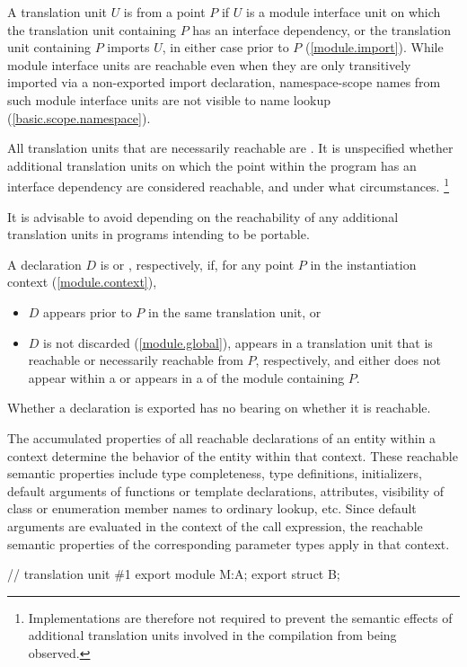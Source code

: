 \begin{std.txt}\color{addclr}
\pnum
A translation unit $U$ is  from a point $P$ if
$U$ is a module interface unit on which the translation unit containing $P$
has an interface dependency, or
the translation unit containing $P$ imports $U$,
in either case prior to $P$ (\ref{module.import}).
\enternote
While module interface units are reachable even when they are only
transitively imported via a non-exported import declaration,
namespace-scope names from such module interface units are not visible
to name lookup (\ref{basic.scope.namespace}).
\exitnote

\pnum
All translation units that are necessarily reachable are .
It is unspecified whether additional translation units on which the
point within the program has an interface dependency are considered reachable,
and under what circumstances.%
\footnote{Implementations are therefore not required to prevent the semantic
effects of additional translation units involved in the compilation from being
observed.}
\begin{note}
It is advisable to avoid
depending on the reachability of any additional translation units
in programs intending to be portable.
\end{note}

\pnum
A declaration $D$ is  or , respectively, if,
for any point $P$ in the
instantiation context (\ref{module.context}),
\begin{itemize}
\item $D$ appears prior to $P$ in the same translation unit, or
\item $D$ is not discarded (\ref{module.global}),
appears in a translation unit that is
reachable or necessarily reachable from $P$, respectively,
and
either does not appear within a 
or appears in a 
of the module containing $P$.
\end{itemize}
\enternote
Whether a declaration is exported has no bearing on whether it is reachable.
\exitnote

\pnum
The accumulated properties of all reachable declarations of
an entity within a context
determine the behavior of the entity within that context.
\enternote
These reachable semantic properties include type completeness,
type definitions, initializers,
default arguments of functions or template declarations, attributes,
visibility of class or enumeration member names to ordinary lookup,
etc.
Since default arguments are evaluated in the context of the call expression,
the reachable semantic properties of the corresponding parameter types apply in
that context.
\begin{example}
\begin{codeblock}
// translation unit \#1
export module M:A;
export struct B;


\end{codeblock}
\end{example}
\end{std.txt}
